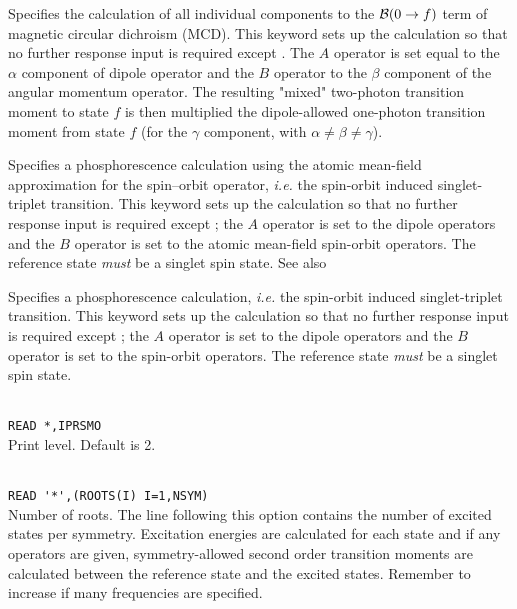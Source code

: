 \begin{description}
\item{}
Specifies the calculation of all individual components to the
${\cal{B}}(0\to f)$ term of magnetic circular dichroism
(MCD).
This keyword sets up the calculation so that no further response input is required except .
The $A$ operator is set equal to the $\alpha$ component of dipole
operator and
the $B$ operator to the $\beta$ component of the angular momentum
operator. The resulting "mixed" two-photon transition moment to state $f$
is then multiplied the dipole-allowed one-photon transition moment
from state $f$ (for the $\gamma$ component, with $\alpha \neq \beta \neq \gamma$).
\cite{Coriani:MCDRSP}

\item{}
Specifies a phosphorescence calculation using
the atomic mean-field approximation for the spin--orbit operator, {\it i.e.\/}
the spin-orbit
induced singlet-triplet transition. This keyword sets up the
calculation so that no further response input is required except ; the
$A$ operator is set to the dipole operators and
the $B$ operator
is set to the atomic mean-field spin-orbit
operators.
The reference state {\em must} be a singlet spin state. See also 

\item{}
Specifies a phosphorescence calculation, {\it i.e.\/}
the spin-orbit
induced singlet-triplet transition. This keyword sets up the
calculation so that no further response input is required except ; the
$A$ operator is set to the dipole operators and
the $B$ operator
is set to the spin-orbit
operators. \cite{ovhapjhjajthjojcp97,haovbmaqc27}
The reference state {\em must} be a singlet spin state.

\item{}\\
\verb|READ *,IPRSMO|\\
Print level. Default is 2.

\item{}\\
\verb|READ '*',(ROOTS(I) I=1,NSYM)|\\
Number of roots.  The line following this option contains the number
of excited states per symmetry. Excitation
energies are calculated for each state and if
any operators are given,
symmetry-allowed second order transition moments are
calculated between the
reference state and the excited states.
Remember to increase  if many frequencies are specified.


\end{description}
